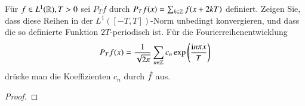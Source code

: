 
\begin{exercise}
  Für $f \in L^1(\mathbb{R}), T>0$ sei $P_T f$ durch $P_T f(x)=\sum_{k \in \mathbb{Z}}{f(x+2kT)}$ definiert. Zeigen Sie, dass diese Reihen in der $L^1([-T,T])$-Norm unbedingt konvergieren, und dass die so definierte Funktion $2T$-periodisch ist. Für die Fourierreihenentwicklung
  \begin{equation*}
    P_T f(x)=\frac{1}{\sqrt{2\pi}} \sum_{n \in \mathbb{Z}}{c_n \exp\left(\frac{\mathrm{i} n\pi x}{T}\right)}
  \end{equation*}
  drücke man die Koeffizienten $c_n$ durch $\hat{f}$ aus.
\end{exercise}

\begin{proof}

\end{proof}
